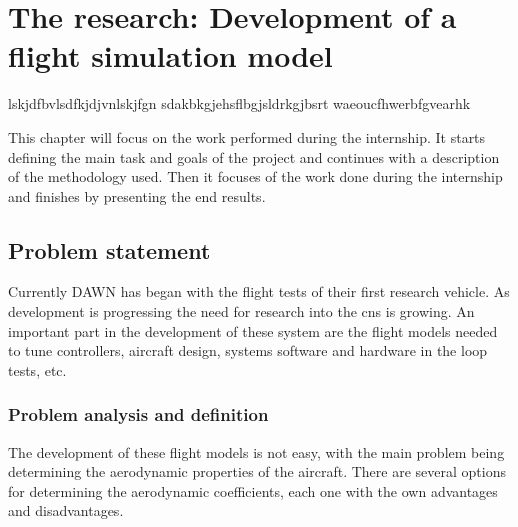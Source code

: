 \chapter{The research: Development of a flight simulation model}

lskjdfbvlsdfkjdjvnlskjfgn
sdakbkgjehsflbgjsldrkgjbsrt
waeoucfhwerbfgvearhk

This chapter will focus on the work performed during the internship. It starts defining the main task and goals of the project and continues with a description of the methodology used. Then it focuses of the work done during the internship and finishes by presenting the end results.

\section{Problem statement}
Currently DAWN has began with the flight tests of their first research vehicle. As development is progressing the need for research into the \gls{cns} is growing. An important part in the development of these system are the flight models needed to tune controllers, aircraft design, systems software and hardware in the loop tests, etc. 

\subsection{Problem analysis and definition}
The development of these flight models is not easy, with the main problem being determining the aerodynamic properties of the aircraft. There are several options for determining the aerodynamic coefficients, each one with the own advantages and disadvantages.

